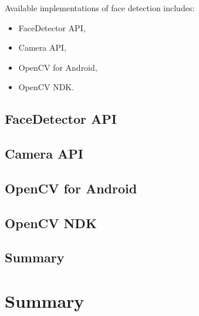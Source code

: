 \documentclass[openany]{mgr} %
\begin{document}
Available implementations of face detection includes:
\begin{itemize}
  \item FaceDetector API,
  \item Camera API,
  \item OpenCV for Android,
  \item OpenCV NDK.
\end{itemize}


\section{FaceDetector API}




\section{Camera API}



\section{OpenCV for Android}




\section{OpenCV NDK}

\section{Summary}

\chapter{Summary}
\end{document}
